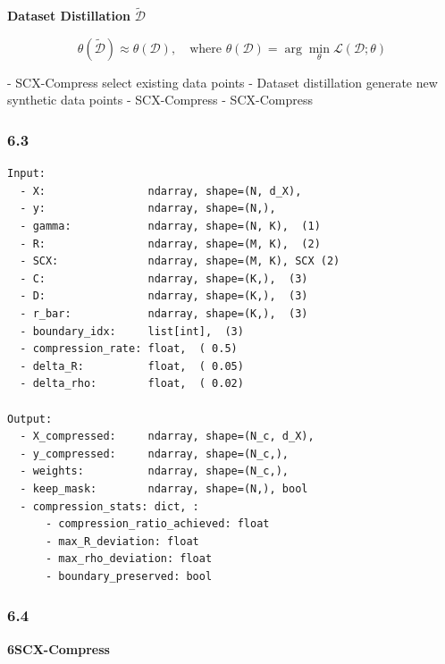 \documentclass[
  12pt,
]{article}
\begin{document}
\textbf{Dataset Distillation} \(\tilde{\mathcal{D}}\)


\[
\theta(\tilde{\mathcal{D}}) \approx \theta(\mathcal{D}), \quad \text{where } \theta(\mathcal{D}) = \arg\min_\theta \mathcal{L}(\mathcal{D}; \theta)
\]

\textbf{} - SCX-Compress \textbf{}select existing
data points - Dataset distillation \textbf{}generate new
synthetic data points - \textbf{} SCX-Compress
 - SCX-Compress


\subsubsection{6.3
}\label{ux8f93ux5165ux8f93ux51faux89c4ux8303-5}

\begin{verbatim}
Input:
  - X:                ndarray, shape=(N, d_X), 
  - y:                ndarray, shape=(N,), 
  - gamma:            ndarray, shape=(N, K),  (1)
  - R:                ndarray, shape=(M, K),  (2)
  - SCX:              ndarray, shape=(M, K), SCX (2)
  - C:                ndarray, shape=(K,),  (3)
  - D:                ndarray, shape=(K,),  (3)
  - r_bar:            ndarray, shape=(K,),  (3)
  - boundary_idx:     list[int],  (3)
  - compression_rate: float,  ( 0.5)
  - delta_R:          float,  ( 0.05)
  - delta_rho:        float,  ( 0.02)

Output:
  - X_compressed:     ndarray, shape=(N_c, d_X), 
  - y_compressed:     ndarray, shape=(N_c,), 
  - weights:          ndarray, shape=(N_c,), 
  - keep_mask:        ndarray, shape=(N,), bool 
  - compression_stats: dict, :
      - compression_ratio_achieved: float
      - max_R_deviation: float
      - max_rho_deviation: float
      - boundary_preserved: bool
\end{verbatim}

\subsubsection{6.4 }\label{ux5b9eux73b0ux65b9ux6cd5-5}

\textbf{ 6SCX-Compress}
\end{document}
